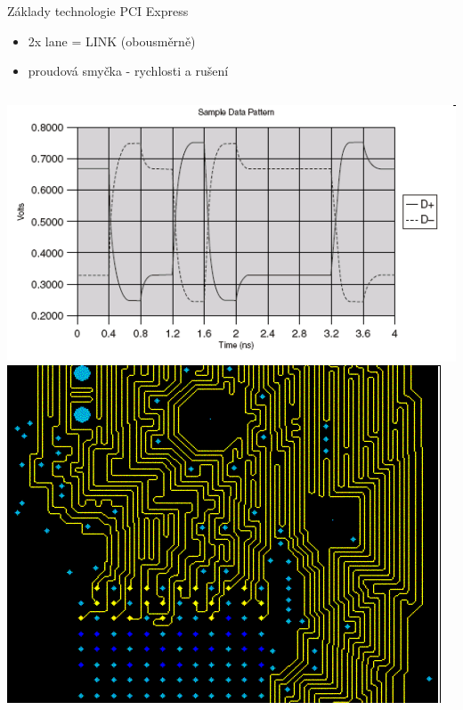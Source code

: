 \documentclass[aspectratio=43]{beamer}
\begin{document}
\begin{frame}{Základy technologie PCI Express}
	\begin{itemize}
		\item 2x lane = LINK (obousměrně)
		\item proudová smyčka - rychlosti a rušení
	\end{itemize}
	
	\begin{columns}
		\includegraphics[width=1\linewidth]{extrahovane_obrazky/img_2_page5_14.png}
		\includegraphics[width=1\linewidth]{extrahovane_obrazky/img_2_page5_15.png}
	\end{columns}
	
\end{frame}
\end{document}
